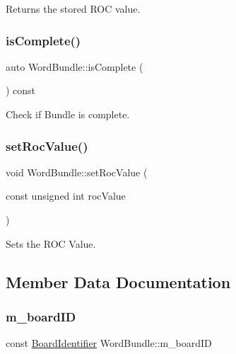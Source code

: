 Returns the stored R\+OC value. 

\mbox{\label{class_word_bundle_a3afd16d04f92eec06e08a6ec59028ae9}} 
\subsubsection{\texorpdfstring{is\+Complete()}{isComplete()}}
{\footnotesize\ttfamily auto Word\+Bundle\+::is\+Complete (\begin{DoxyParamCaption}{ }\end{DoxyParamCaption}) const\hspace{0.3cm}{\ttfamily [inline]}}



Check if Bundle is complete. 

\mbox{\label{class_word_bundle_a15e13fdd7380c72be2f42013560d62c3}} 
\subsubsection{\texorpdfstring{set\+Roc\+Value()}{setRocValue()}}
{\footnotesize\ttfamily void Word\+Bundle\+::set\+Roc\+Value (\begin{DoxyParamCaption}\item[{const unsigned int}]{roc\+Value }\end{DoxyParamCaption})\hspace{0.3cm}{\ttfamily [inline]}}



Sets the R\+OC Value. 



\subsection{Member Data Documentation}
\mbox{\label{class_word_bundle_a77d34b8fe38566bc2b3144675aa53c77}} 
\subsubsection{\texorpdfstring{m\+\_\+board\+ID}{m\_boardID}}
{\footnotesize\ttfamily const \hyperlink{class_board_identifier}{Board\+Identifier} Word\+Bundle\+::m\+\_\+board\+ID\hspace{0.3cm}{\ttfamily [private]}}

